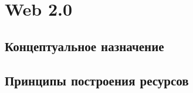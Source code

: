 \chapter{Web 2.0}\label{ch:ch2}

\section{Концептуальное назначение}\label{sec:ch2/sec1}

%

\section{Принципы построения ресурсов}\label{sec:ch2/sect2}

